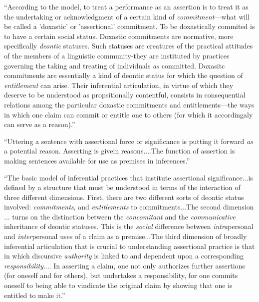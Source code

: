 ``According to the model, to treat a performance as an assertion is to
treat it as the undertaking or acknowledgment of a certain kind of
\textit{commitment}---what will be called a 'doxastic' or 'assertional'
commitment.  To be doxastically commited is to have a certain social
status.  Doxastic commitments are normative, more specifically
\textit{deontic} statuses.  Such statuses are creatures of the
practical attitudes of the members of a linguistic community-they are
instituted by practices governing the taking and treating of
individuals \textit{as} committed.  Doxasitc commitments are
essentially a kind of deontic status for which the question of
\textit{entitlement} can arise.  Their inferential articulation, in
virtue of which they deserve to be understood as propsitionally
contentful, consists in consequential relations among the particular
doxastic commitments and entitlements---the ways in which one claim can
commit or entitle one to others (for which it accordingaly can serve
as a reason).''  \citep[142]{brandom_making_1998}

``Uttering a sentence with assertional force or significance is
putting it forward \textit{as} a potential reason.  Asserting is
givein reasons....The function of assertion is making sentences
available for use as premises in inferences.'' \citep[168]{brandom_making_1998}

``The basic model of inferential practices that institute assertional
significance...is defined by a structure that must be understood in
terms of the interaction of three different dimensions.  First, there
are two different sorts of deontic status involved:
\textit{commitments}, and \textit{entitlements} to commitments...The
second dimension ... turns on the distinction between the
\textit{concomitant} and the \textit{communicative} inheritance of
deontic statuses.  This is the \textit{social} difference between
\textit{intra}personal and \textit{inter}personal uses of a claim as a
premise...The third dimension of broadly inferential articulation
that is crucial to understanding assertional practice is that in which
discursive \textit{authority} is linked to and dependent upon a
corresponding \textit{responsibility}.... In asserting a claim, one
not only authorizes further assertions (for oneself and for others),
but undertakes a responsibility, for one commits oneself to being able
to vindicate the original claim by showing that one is entitled to
make it.''\citep[168-171]{brandom_making_1998}

